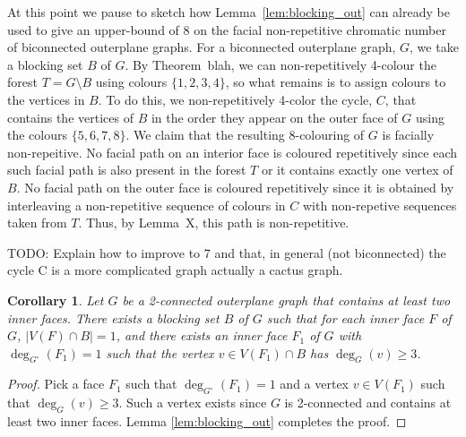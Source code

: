 \documentclass{patmorin}
\newcommand{\wdual}[1]{#1^{\circ}}
\newtheorem{corollary}[theorem]{Corollary}
\begin{document}
At this point we pause to sketch how Lemma~\ref{lem:blocking_out}
can already be used to give an upper-bound of 8 on the facial
non-repetitive chromatic number of biconnected outerplane graphs.
For a biconnected outerplane graph, $G$, we take a blocking set $B$
of $G$.  By Theorem~blah, we can non-repetitively 4-colour the forest
$T=G\setminus B$ using colours $\{1,2,3,4\}$, so what remains is to assign
colours to the vertices in $B$.  To do this, we non-repetitively 4-color
the cycle, $C$, that contains the vertices of $B$ in the order they appear on
the outer face of $G$ using the colours $\{5,6,7,8\}$.  We claim that
the resulting 8-colouring of $G$ is facially non-repeitive.  No facial
path on an interior face is coloured repetitively since each such facial path
is also present in the forest $T$ or it contains exactly one
vertex of $B$.  No facial path on the outer face is coloured repetitively
since it is obtained by interleaving a non-repetitive sequence of colours in $C$ with non-repetive sequences taken from $T$. Thus, by Lemma~X, this path is non-repetitive.

TODO: Explain how to improve to 7 and that, in general (not biconnected)
the cycle C is a more complicated graph
 actually a cactus graph.
 


\begin{corollary}
 Let $G$ be a 2-connected outerplane graph that contains at least two inner faces. There exists a blocking set $B$ of $G$ such that for each inner face $F$ of $G$, $|V(F) \cap B|=1$, and there exists an inner face $F_1$ of $G$ with $\deg_{\wdual{G}}(F_1)=1$ such that the vertex $v \in V(F_1) \cap B$ has $\deg_G(v) \geq 3$.
  \label{cor:blocking_out_select}
\end{corollary}

\begin{proof}
  Pick a face $F_1$ such that $\deg_{\wdual{G}}(F_1)=1$ and a vertex $v \in V(F_1)$ such that $\deg_G(v) \geq 3$. Such a vertex exists since $G$ is 2-connected and contains at least two inner faces. Lemma \ref{lem:blocking_out} completes the proof. 
\end{proof}
\end{document}
